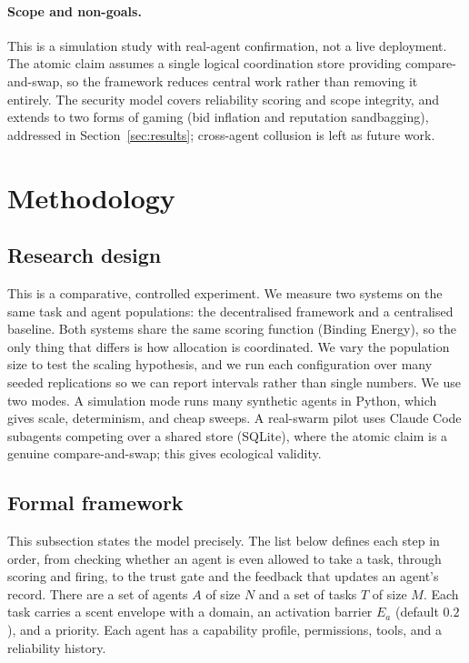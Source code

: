 \documentclass[11pt]{article}
\begin{document}
\paragraph{Scope and non-goals.} This is a simulation study with real-agent confirmation, not a live deployment. The atomic claim assumes a single logical coordination store providing compare-and-swap, so the framework reduces central work rather than removing it entirely. The security model covers reliability scoring and scope integrity, and extends to two forms of gaming (bid inflation and reputation sandbagging), addressed in Section~\ref{sec:results}; cross-agent collusion is left as future work.

\section{Methodology}

\subsection{Research design}
This is a comparative, controlled experiment. We measure two systems on the same task and agent populations: the decentralised framework and a centralised baseline. Both systems share the same scoring function (Binding Energy), so the only thing that differs is how allocation is coordinated. We vary the population size to test the scaling hypothesis, and we run each configuration over many seeded replications so we can report intervals rather than single numbers. We use two modes. A simulation mode runs many synthetic agents in Python, which gives scale, determinism, and cheap sweeps. A real-swarm pilot uses Claude Code subagents competing over a shared store (SQLite), where the atomic claim is a genuine compare-and-swap; this gives ecological validity.

\subsection{Formal framework}
This subsection states the model precisely. The list below defines each step in order, from checking whether an agent is even allowed to take a task, through scoring and firing, to the trust gate and the feedback that updates an agent's record. There are a set of agents $A$ of size $N$ and a set of tasks $T$ of size $M$. Each task carries a scent envelope with a domain, an activation barrier $E_a$ (default $0.2$), and a priority. Each agent has a capability profile, permissions, tools, and a reliability history.
\end{document}
